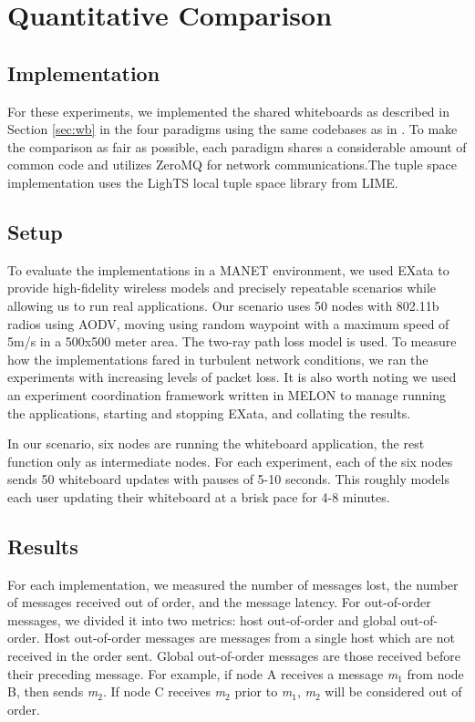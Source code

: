 \documentclass{llncs}
\begin{document}
\section{Quantitative Comparison}\label{sec:comparison}

\subsection{Implementation}

For these experiments, we implemented the shared whiteboards as described in Section \ref{sec:wb} in the four paradigms using the same codebases as in \cite{melon}. To make the comparison as fair as possible, each paradigm shares a considerable amount of common code and utilizes ZeroMQ for network communications.The tuple space implementation uses the LighTS\cite{lights} local tuple space library from LIME.

\subsection{Setup}

To evaluate the implementations in a MANET environment, we used EXata\cite{exata} to provide high-fidelity wireless models and precisely repeatable scenarios while allowing us to run real applications. Our scenario uses 50 nodes with 802.11b radios using AODV\cite{aodv}, moving using random waypoint with a maximum speed of 5m/s in a 500x500 meter area. The two-ray path loss model is used. To measure how the implementations fared in turbulent network conditions, we ran the experiments with increasing levels of packet loss. It is also worth noting we used an experiment coordination framework written in MELON to manage running the applications, starting and stopping EXata, and collating the results.

In our scenario, six nodes are running the whiteboard application, the rest function only as intermediate nodes. For each experiment, each of the six nodes sends 50 whiteboard updates with pauses of 5-10 seconds. This roughly models each user updating their whiteboard at a brisk pace for 4-8 minutes.

\subsection{Results}

For each implementation, we measured the number of messages lost, the number of messages received out of order, and the message latency. For out-of-order messages, we divided it into two metrics: host out-of-order and global out-of-order. Host out-of-order messages are messages from a single host which are not received in the order sent. Global out-of-order messages are those received before their preceding message. For example, if node A receives a message \textit{m}$_{1}$ from node B, then sends \textit{m}$_{2}$. If node C receives \textit{m}$_{2}$ prior to \textit{m}$_{1}$, \textit{m}$_{2}$ will be considered out of order.
\end{document}
